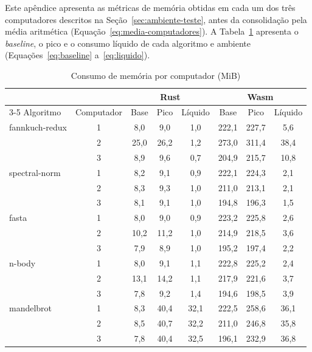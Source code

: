 Este apêndice apresenta as métricas de memória obtidas em cada um dos três computadores descritos na Seção~\ref{sec:ambiente-teste}, antes da consolidação pela média aritmética (Equação~\eqref{eq:media-computadores}). A Tabela~\ref{tab:ap-memoria} apresenta o \emph{baseline}, o pico e o consumo líquido de cada algoritmo e ambiente (Equações~\eqref{eq:baseline} a~\eqref{eq:liquido}).

\begin{table}[H]
    \caption{Consumo de memória por computador (MiB)}
    \label{tab:ap-memoria}
    \centering
    \setlength{\tabcolsep}{4pt}
    \begin{tabular}{lccccccc}
        \hline
        & & \multicolumn{3}{c}{Rust} & \multicolumn{3}{c}{Wasm} \\
        \cline{3-5} \cline{6-8}
        Algoritmo & Computador & Base & Pico & Líquido & Base & Pico & Líquido \\
        \hline
        fannkuch-redux & 1 & 8,0 & 9,0 & 1,0 & 222,1 & 227,7 & 5,6 \\
         & 2 & 25,0 & 26,2 & 1,2 & 273,0 & 311,4 & 38,4 \\
         & 3 & 8,9 & 9,6 & 0,7 & 204,9 & 215,7 & 10,8 \\
        \hline
        spectral-norm & 1 & 8,2 & 9,1 & 0,9 & 222,1 & 224,3 & 2,1 \\
         & 2 & 8,3 & 9,3 & 1,0 & 211,0 & 213,1 & 2,1 \\
         & 3 & 8,1 & 9,1 & 1,0 & 194,8 & 196,3 & 1,5 \\
        \hline
        fasta & 1 & 8,0 & 9,0 & 0,9 & 223,2 & 225,8 & 2,6 \\
         & 2 & 10,2 & 11,2 & 1,0 & 214,9 & 218,5 & 3,6 \\
         & 3 & 7,9 & 8,9 & 1,0 & 195,2 & 197,4 & 2,2 \\
        \hline
        n-body & 1 & 8,0 & 9,1 & 1,1 & 222,8 & 225,2 & 2,4 \\
         & 2 & 13,1 & 14,2 & 1,1 & 217,9 & 221,6 & 3,7 \\
         & 3 & 7,8 & 9,2 & 1,4 & 194,6 & 198,5 & 3,9 \\
        \hline
        mandelbrot & 1 & 8,3 & 40,4 & 32,1 & 222,5 & 258,6 & 36,1 \\
         & 2 & 8,5 & 40,7 & 32,2 & 211,0 & 246,8 & 35,8 \\
         & 3 & 7,8 & 40,4 & 32,5 & 196,1 & 232,9 & 36,8 \\
        \hline
    \end{tabular}
\end{table}
